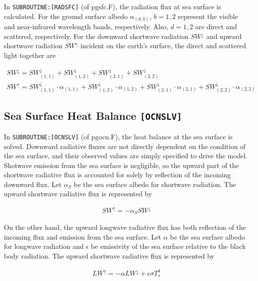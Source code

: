 In \texttt{SUBROUTINE:{[}RADSFC{]}} (of pgsfc.F), the radiation flux at
sea surface is calculated. For the ground surface albedo
\(\alpha_{(d,b)}\), \(b=1,2\) represent the visible and near-infrared
wavelength bands, respectively. Also, \(d=1,2\) are direct and
scattered, respectively. For the downward shortwave radiation
\(SW^\downarrow\) and upward shortwave radiation \(SW^\uparrow\)
incident on the earth's surface, the direct and scattered light together
are

\begin{eqnarray}
    SW^\downarrow = SW^\downarrow_{(1,1)}+SW^\downarrow_{(1,2)}+SW^\downarrow_{(2,1)}+SW^\downarrow_{(2,2)} \\
SW^\uparrow = SW^\downarrow_{(1,1)}\cdot\alpha_{(1,1)}+SW^\downarrow_{(1,2)}\cdot\alpha_{(1,2)}+SW^\downarrow_{(2,1)}\cdot\alpha_{(2,1)}+SW^\downarrow_{(2,2)}\cdot\alpha_{(2,2)}
\end{eqnarray}

\hypertarget{sea-surface-heat-balance-ocnslv}{%
\subsection{\texorpdfstring{Sea Surface Heat Balance
\texttt{{[}OCNSLV{]}}}{Sea Surface Heat Balance {[}OCNSLV{]}}}\label{sea-surface-heat-balance-ocnslv}}

In \texttt{SUBROUTINE:{[}OCNSLV{]}} (of pgocn.F), the heat balance at
the sea surface is solved. Downward radiative fluxes are not directly
dependent on the condition of the sea surface, and their observed values
are simply specified to drive the model. Shotwave emission from the sea
surface is negligible, so the upward part of the shortwave radiative
flux is accounted for solely by reflection of the incoming downward
flux. Let \(\alpha _S\) be the sea surface albedo for shortwave
radiation. The upward shortwave radiative flux is represented by

\begin{eqnarray}
    SW^\uparrow = - \alpha_S SW^\downarrow
\end{eqnarray}

On the other hand, the upward longwave radiative flux has both
reflection of the incoming flux and emission from the sea surface. Let
\(\alpha\) be the sea surface albedo for longwave radiation and
\(\epsilon\) be emissivity of the sea surface relative to the black body
radiation. The upward shortwave radiative flux is represented by

\begin{eqnarray}
    LW^\uparrow = - \alpha LW^\downarrow + \epsilon \sigma T_s ^4
\end{eqnarray}


